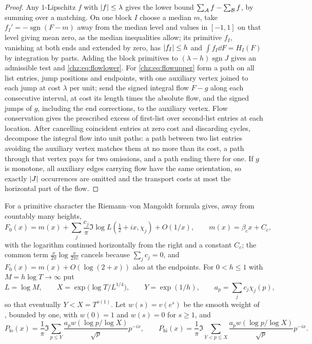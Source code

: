 \begin{proof}
Any $1$-Lipschitz $f$ with $\lvert f\rvert\le\lambda$ gives the lower bound $\sum_{\mathcal{A}} f-\sum_{\mathcal{B}} f$, by summing over a
matching. On one block $I$ choose a median $m$, take $f_I'=-\operatorname{sgn}(F-m)$ away from the median level and
values in $[-1,1]$ on that level giving mean zero, as the median inequalities allow; its primitive $f_I$,
vanishing at both ends and extended by zero, has $\lvert f_I\rvert\le h$ and $\int f_I\dd F=H_I(F)$ by integration by
parts. Adding the block primitives to $(\lambda-h)\operatorname{sgn}J$ gives an admissible test and
\eqref{chz:eq:flowlower}. For \eqref{chz:eq:flowupper} form a path on all list entries, jump positions and
endpoints, with one auxiliary vertex joined to each jump at cost $\lambda$ per unit; send the signed integral flow
$F-g$ along each consecutive interval, at cost its length times the absolute flow, and the signed jumps of $g$,
including the end corrections, to the auxiliary vertex. Flow conservation gives the prescribed excess of
first-list over second-list entries at each location. After cancelling coincident entries at zero cost and
discarding cycles, decompose the integral flow into unit paths: a path between two list entries avoiding the
auxiliary vertex matches them at no more than its cost, a path through that vertex pays for two omissions, and
a path ending there for one. If $g$ is monotone, all auxiliary edges carrying flow have the same orientation,
so exactly $\lvert J\rvert$ occurrences are omitted and the transport costs at most the horizontal part of the flow.
\end{proof}

For a primitive character the Riemann--von Mangoldt formula gives, away from countably many heights,
\begin{equation}\label{chz:eq:countdiff}
 F_0(x)=m(x)+\sum_j\frac{c_j}\pi\Im\log L(\tfrac12+ix,\chi_j)+O(1/x),\qquad m(x)=\beta_cx+C_c,
\end{equation}
with the logarithm continued horizontally from the right and a constant $C_c$; the common term
$\frac x{2\pi}\log\frac x{2\pi e}$ cancels because $\sum_jc_j=0$, and $F_0(x)=m(x)+O(\log(2+x))$ also at the
endpoints. For $0<h\le1$ with $M=h\log T\to\infty$ put
\[
 L=\log M,\qquad X=\exp\bigl(\log T/L^{1/4}\bigr),\qquad Y=\exp(1/h),\qquad a_p=\sum_jc_j\chi_j(p),
\]
so that eventually $Y<X=T^{o(1)}$. Let $w(s)=v(e^s)$ be the smooth weight of \cite[\S2]{BombieriPerelli1998Distinct},
bounded by one, with $w(0)=1$ and $w(s)=0$ for $s\ge1$, and
\[
 P_{\mathrm{lo}}(x)=\frac1\pi\Im\sum_{p\le Y}\frac{a_pw(\log p/\log X)}{\sqrt p}p^{-ix},\qquad
 P_{\mathrm{hi}}(x)=\frac1\pi\Im\sum_{Y<p\le X}\frac{a_pw(\log p/\log X)}{\sqrt p}p^{-ix}.
\]

